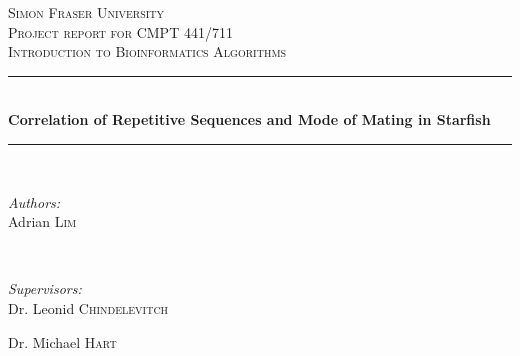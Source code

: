 	\begin{titlepage}

		\newcommand{\HRule}{\rule{\linewidth}{0.5mm}} %

		\center %


		\textsc{\LARGE Simon Fraser University}\\[1.5cm] %
		\textsc{\Large Project report for CMPT 441/711}\\[0.5cm] %
		\textsc{\large Introduction to Bioinformatics Algorithms}\\[0.5cm] %


		\HRule \\[0.4cm]
		{ \huge \bfseries Correlation of Repetitive Sequences and Mode of Mating in Starfish}\\[0.4cm] %
		\HRule \\[1.5cm]


		\begin{minipage}{0.4\textwidth}
			\begin{flushleft} \large
				\emph{Authors:}\\
				Adrian \textsc{Lim} \\
			\end{flushleft}
		\end{minipage}
		~
		\begin{minipage}{0.4\textwidth}
			\begin{flushright} \large
				\emph{Supervisors:} \\
				Dr. Leonid \textsc{Chindelevitch} %

				Dr. Michael \textsc{Hart} %
			\end{flushright}
		\end{minipage}\\[2cm]


\end{titlepage}

